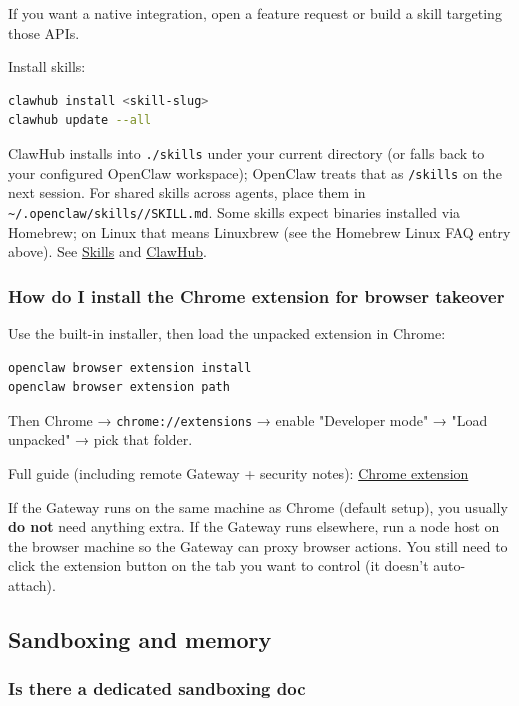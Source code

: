 If you want a native integration, open a feature request or build a skill
targeting those APIs.

Install skills:

\begin{lstlisting}[language=bash]
clawhub install <skill-slug>
clawhub update --all
\end{lstlisting}


ClawHub installs into \texttt{./skills} under your current directory (or falls back to your configured OpenClaw workspace); OpenClaw treats that as \texttt{/skills} on the next session. For shared skills across agents, place them in \texttt{\textasciitilde{}/.openclaw/skills//SKILL.md}. Some skills expect binaries installed via Homebrew; on Linux that means Linuxbrew (see the Homebrew Linux FAQ entry above). See \href{/tools/skills}{Skills} and \href{/tools/clawhub}{ClawHub}.

\subsubsection{How do I install the Chrome extension for browser takeover}


Use the built-in installer, then load the unpacked extension in Chrome:

\begin{lstlisting}[language=bash]
openclaw browser extension install
openclaw browser extension path
\end{lstlisting}


Then Chrome → \texttt{chrome://extensions} → enable "Developer mode" → "Load unpacked" → pick that folder.

Full guide (including remote Gateway + security notes): \href{/tools/chrome-extension}{Chrome extension}

If the Gateway runs on the same machine as Chrome (default setup), you usually \textbf{do not} need anything extra.
If the Gateway runs elsewhere, run a node host on the browser machine so the Gateway can proxy browser actions.
You still need to click the extension button on the tab you want to control (it doesn't auto-attach).

\subsection{Sandboxing and memory}


\subsubsection{Is there a dedicated sandboxing doc}


